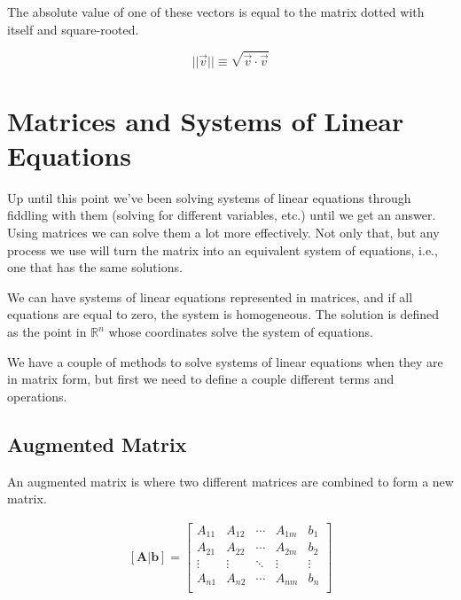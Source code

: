     The absolute value of one of these vectors is equal to the matrix dotted with itself and square-rooted.

    \begin{equation}\label{eq:matrix_abs_val}
        ||\vec{v}|| \equiv \sqrt{\vec{v} \cdot \vec{v}}
    \end{equation}

\section{Matrices and Systems of Linear Equations}
Up until this point we've been solving systems of linear equations through fiddling with them (solving for different variables, etc.) until we get an answer. Using matrices we can solve them a lot more effectively. Not only that, but any process we use will turn the matrix into an equivalent system of equations, i.e., one that has the same solutions.

We can have systems of linear equations represented in matrices, and if all equations are equal to zero, the system is homogeneous. The solution is defined as the point in $\mathbb{R}^n$ whose coordinates solve the system of equations.

We have a couple of methods to solve systems of linear equations when they are in matrix form, but first we need to define a couple different terms and operations.

    \subsection{Augmented Matrix}
    An augmented matrix is where two different matrices are combined to form a new matrix.

    \begin{equation}\label{eq:augmented_matrix}
    \begin{aligned}
        \mathbf{[A|b]}=
        \left[\begin{array}{cccc|c}
        A_{11} & A_{12} & \cdots & A_{1m} & b_1\\
        A_{21} & A_{22} & \cdots & A_{2m} & b_2\\
        \vdots & \vdots & \ddots & \vdots & \vdots\\
        A_{n1} & A_{n2} & \cdots & A_{nm} & b_n\\
        \end{array}\right]\\
    \end{aligned}
    \end{equation}

